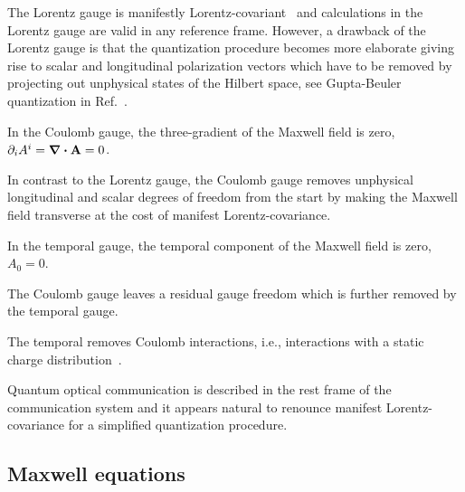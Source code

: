 The Lorentz gauge is manifestly Lorentz-covariant~\cite[p.~144]{Greiner2013} and calculations in the Lorentz gauge are valid in any reference frame.
However, a drawback of the Lorentz gauge is that the quantization procedure becomes more elaborate giving rise to scalar and longitudinal polarization vectors which have to be removed by projecting out unphysical states of the Hilbert space, see Gupta-Beuler quantization in Ref.~\cite[p.~180]{Greiner2013}.
\begin{definition}
	In the Coulomb gauge, the three-gradient of the Maxwell field is zero, $\partial_iA^i=\div\vb{A}=0$.
\end{definition}
In contrast to the Lorentz gauge, the Coulomb gauge removes unphysical longitudinal and scalar degrees of freedom from the start by making the Maxwell field transverse at the cost of manifest Lorentz-covariance.
\begin{definition}
	In the temporal gauge, the temporal component of the Maxwell field is zero, $A_0=0$.
\end{definition}
The Coulomb gauge leaves a residual gauge freedom which is further removed by the temporal gauge.
\begin{remark}
	The temporal removes Coulomb interactions, i.e., interactions with a static charge distribution~\cite[p.~200]{Greiner2013}.
\end{remark}

Quantum optical communication is described in the rest frame of the communication system and it appears natural to renounce manifest Lorentz-covariance for a simplified quantization procedure.

\subsection{Maxwell equations}

